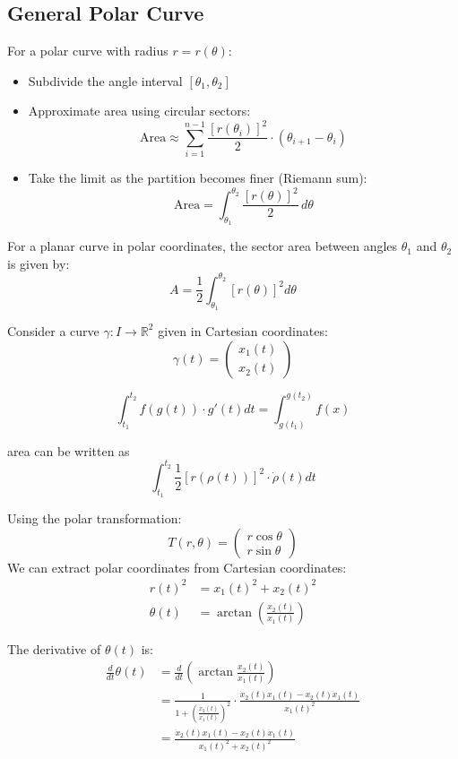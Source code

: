 \documentclass{article}
\begin{document}
\subsection{General Polar Curve}
For a polar curve with radius $r = r(\theta)$:
\begin{itemize}
    \item Subdivide the angle interval $[\theta_1, \theta_2]$
    \item Approximate area using circular sectors:
    \[ \text{Area} \approx \sum_{i=1}^{n-1} \frac{[r(\theta_i)]^2}{2} \cdot (\theta_{i+1} - \theta_i) \]
    \item Take the limit as the partition becomes finer (Riemann sum):
    \[ \text{Area} = \int_{\theta_1}^{\theta_2} \frac{[r(\theta)]^2}{2} \, d\theta \]
\end{itemize}

For a planar curve in polar coordinates, the sector area between angles $\theta_1$ and $\theta_2$ is given by:
\[ A = \frac{1}{2}\int_{\theta_1}^{\theta_2} [r(\theta)]^2 d\theta \]

\vspace{5mm}
Consider a curve $\gamma: I \rightarrow \mathbb{R}^2$ given in Cartesian coordinates:
\[ \gamma(t) = \begin{pmatrix} x_1(t) \\ x_2(t) \end{pmatrix} \]

\[
\int_{t_1}^{t_2} f(g(t)) \cdot g'(t) dt = \int_{g(t_1)}^{g(t_2)} f(x)
\]

area can be written as 
\[
\int_{t_1}^{t_2} \frac{1}{2} [r(\rho(t))]^{2} \cdot \dot{\rho}(t) dt 
\]

Using the polar transformation:
\[ T(r,\theta) = \begin{pmatrix} r\cos\theta \\ r\sin\theta \end{pmatrix} \]
\newpage
We can extract polar coordinates from Cartesian coordinates:
\begin{align*}
r(t)^2 &= x_1(t)^2 + x_2(t)^2 \\
\theta(t) &= \arctan\left(\frac{x_2(t)}{x_1(t)}\right)
\end{align*}


The derivative of $\theta(t)$ is:
\begin{align*}
\frac{d}{dt}\theta(t) &= \frac{d}{dt}\left(\arctan\frac{x_2(t)}{x_1(t)}\right) \\
&= \frac{1}{1 + \left(\frac{x_2(t)}{x_1(t)}\right)^2} \cdot \frac{\dot{x}_2(t)x_1(t) - x_2(t)\dot{x}_1(t)}{x_1(t)^2} \\
&= \frac{\dot{x}_2(t)x_1(t) - x_2(t)\dot{x}_1(t)}{x_1(t)^2 + x_2(t)^2}
\end{align*}
\end{document}

